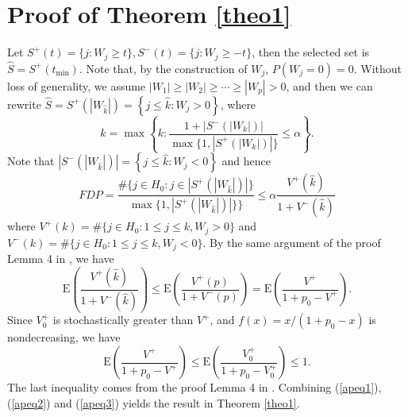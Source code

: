 \documentclass[]{interact}
\theoremstyle{plain}%
\theoremstyle{definition}
\theoremstyle{remark}
\newcommand{\E}{\mathrm{E}}
\begin{document}
\section{Proof of Theorem \ref{theo1}}
Let $S^+(t) = \{j: W_j \ge t\}, S^-(t) = \{j: W_j \ge -t\}$, then the selected set is $\hat S = S^+(t_{\min})$. Note that, by the construction of $W_j$, $P(W_j=0)=0$. Without loss of generality, we assume $|W_1| \ge |W_2| \ge \cdots \ge |W_p| > 0$, and then we can rewrite $\hat S = S^+\left (|W_{\hat k}|\right ) = \left \{ j \le \hat k: W_j >0\right \}$, where
$$
\hat k = \max \left \{k: \frac{1 + \left|S^-\left(\left|W_k\right|\right)\right|}{\max \{1, \left|S^+\left(\left|W_k\right|\right)\right|\}} \le \alpha \right \}.
$$
Note that $ \left|S^-\left(\left|W_{\hat k}\right|\right)\right| = \left \{ j \le \hat k: W_j < 0\right \}$ and hence
\begin{equation}\label{apeq1}
FDP = \frac{\# \{j \in H_0: j \in \left|S^+\left(\left|W_{\hat k}\right|\right)\right|\}}{\max \{1, \left|S^+\left(\left|W_{\hat k}\right|\right)\right|\}\}}  \le \alpha \frac{V^+(\hat k)}{1 + V^-(\hat k)}
\end{equation}
where $V^+(k) = \# \{j \in H_0: 1 \le j \le k, W_j > 0\}$ and $V^-(k) = \# \{j \in H_0: 1 \le j \le k, W_j < 0\}$. By the same argument of the proof Lemma 4 in \cite{barber2015controlling}, we have
\begin{equation}\label{apeq2}
\E \left(\frac{V^+(\hat k)}{1 + V^-(\hat k)}\right) \le\E \left(\frac{V^+(p)}{1 + V^-(p)}\right) =  \E \left(\frac{V^+}{1 + p_0 - V^+}\right).
\end{equation}
Since $V_0^+$ is stochastically greater than $V^+$, and $f(x) = x/(1+p_0-x)$ is nondecreasing, we have
\begin{equation}\label{apeq3}
\E \left(\frac{V^+}{1 + p_0 - V^+}\right) \le \E \left(\frac{V^+_0}{1 + p_0 - V^+_0} \right) \le 1.
\end{equation}
The last inequality comes from the proof Lemma 4 in \cite{barber2015controlling}. Combining (\ref{apeq1}), (\ref{apeq2}) and (\ref{apeq3}) yields the result in Theorem \ref{theo1}.









\end{document}
